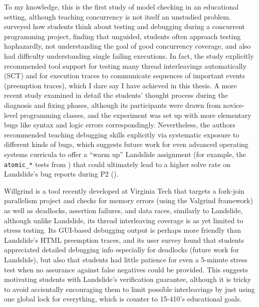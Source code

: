 To my knowledge, this is the first study of model checking in an educational setting,
although teaching concurrency is not itself an unstudied problem.
%
\cite{how-studence} surveyed how students think about
testing and debugging during a concurrent programming project,
finding that unguided, students often approach testing haphazardly,
not understanding the goal of good concurrency coverage,
and also had difficulty understanding single failing executions.
In fact, the study explicitly recommended tool support for testing many thread interleavings automatically (SCT)
and for execution traces to communicate sequences of important events (preemption traces),
which I dare say I have achieved in this thesis.
A more recent study \cite{novices-programmers}
examined in detail the students' thought process
during the diagnosis and fixing phases,
although its participants were drawn from novice-level programming classes,
and the experiment was set up with more elementary bugs like syntax and logic errors correspondingly.
Nevertheless, the authors recommended teaching debugging skills explicitly
via systematic exposure to different kinds of bugs,
which suggests future work for even advanced operating systems curricula
to offer a ``warm up'' Landslide assignment
(for example, the {\tt atomic\_*} tests from \sect{\ref{sec:education-pebbles-tests}})
that could ultimately lead to a higher solve rate on Landslide's bug reports during P2 (\sect{\ref{sec:education-eval-bugs-cmu}}).

Willgrind \cite{willgrind} is a tool recently developed at Virginia Tech
that targets a fork-join parallelism project
and checks for memory errors (using the Valgrind \cite{valgrind} framework)
as well as deadlocks, assertion failures, and data races, similarly to Landslide,
although unlike Landslide, its thread interleaving coverage is as yet limited to stress testing.
Its GUI-based debugging output is perhaps more friendly than Landslide's HTML preemption traces,
and its user survey found that students appreciated detailed debugging info especially for deadlocks
(future work for Landslide),
but also that students had little patience for even a 5-minute stress test
when no assurance against false negatives could be provided.
This suggests motivating students with Landslide's verification guarantee,
although it is tricky to avoid accientally encouraging %
them to limit possible interleavings by just using one global lock for everything,
which is counter to 15-410's educational goals.


